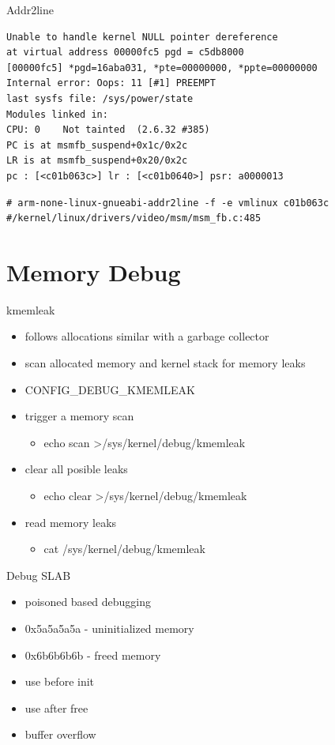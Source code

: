 \documentclass{workshop}
\begin{document}
\begin{frame}[fragile]{Addr2line}
\begin{verbatim}
Unable to handle kernel NULL pointer dereference
at virtual address 00000fc5 pgd = c5db8000
[00000fc5] *pgd=16aba031, *pte=00000000, *ppte=00000000
Internal error: Oops: 11 [#1] PREEMPT
last sysfs file: /sys/power/state
Modules linked in:
CPU: 0    Not tainted  (2.6.32 #385)
PC is at msmfb_suspend+0x1c/0x2c
LR is at msmfb_suspend+0x20/0x2c
pc : [<c01b063c>] lr : [<c01b0640>] psr: a0000013
\end{verbatim}

\begin{verbatim}
# arm-none-linux-gnueabi-addr2line -f -e vmlinux c01b063c
#/kernel/linux/drivers/video/msm/msm_fb.c:485
\end{verbatim}
\end{frame}

\section{Memory Debug}
\begin{frame}{kmemleak}
\begin{itemize}
\item follows allocations similar with a garbage collector
\item scan allocated memory and kernel stack for memory leaks
\item CONFIG_DEBUG_KMEMLEAK
\item trigger a memory scan
\begin{itemize}
\item echo scan \textgreater /sys/kernel/debug/kmemleak
\end{itemize}
\item clear all posible leaks
\begin{itemize}
\item echo clear \textgreater /sys/kernel/debug/kmemleak
\end{itemize}
\item read memory leaks
\begin{itemize}
\item cat /sys/kernel/debug/kmemleak
\end{itemize}
\end{itemize}

\end{frame}

\begin{frame}{Debug SLAB}
\begin{itemize}
\item poisoned based debugging
\item 0x5a5a5a5a - uninitialized memory
\item 0x6b6b6b6b - freed memory
\item use before init
\item use after free
\item buffer overflow
\end{itemize}
\end{frame}
\end{document}

